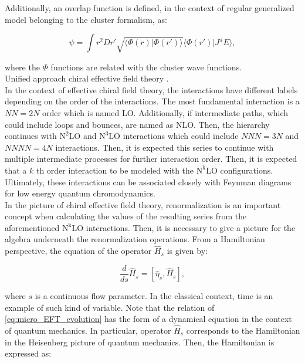 \documentclass[openany]{book}
\begin{document}
Additionally, an overlap function is defined, in the context of regular generalized model belonging to the cluster formalism,  as: 


\begin{equation} \label{eq:micro_FMD_overlap}
	\psi = \int r^2 Dr' \sqrt{\langle \Phi(r) | \Phi(r') \rangle } \langle \Phi(r') | J^{\pi} E \rangle,
\end{equation}

where the $\Phi$ functions are related with the cluster wave functions. \\

Unified approach chiral effective field theory  \cite{navratil_quaglioni_hupin_romero-redondo_calci_2016}. \\

In the context of effective chiral field theory, the interactions have different labels depending on the order of the interactions. The most fundamental interaction is a $NN = 2N$ order which is named LO. Additionally, if intermediate paths, which could include loops and bounces, are named as $\mathrm{NLO}$. Then, the hierarchy continues with $\mathrm{N^2LO}$ and $\mathrm{N^3LO}$ interactions which could include $NNN = 3N$ and $NNNN = 4N$ interactions. Then, it is expected this series to continue with multiple intermediate processes for further interaction order.  Then, it is expected that a $k$ th order interaction to be modeled with the $\mathrm{N^kLO}$ configurations. Ultimately, these interactions can be associated closely with Feynman diagrams for low energy quantum chromodynamics. \\

In the picture of chiral effective field theory, renormalization is an important concept when calculating the values of the resulting series from the aforementioned $\mathrm{N^kLO}$ interactions. Then, it is necessary to give a picture for the algebra underneath the renormalization operations. From a Hamiltonian perspective, the equation of the operator $\hat H_s$ is given by: 

\begin{equation}\label{eq:micro_EFT_evolution}
	\frac{d}{ds}\hat H_s = [\hat \eta_s, \hat H_s],
\end{equation}

where $s$ is a continuous flow parameter. In the classical context, time is an example of such kind of variable. Note that the relation of \ref{eq:micro_EFT_evolution} has the form of a dynamical equation in the context of quantum mechanics. In particular, operator $\hat H_s$ corresponds to the Hamiltonian in the Heisenberg picture of quantum mechanics. Then, the Hamiltonian is expressed as: 
\end{document}
